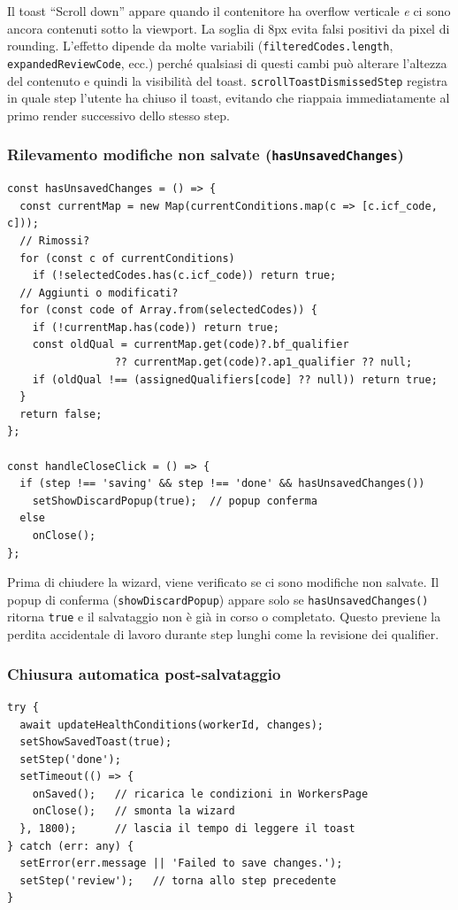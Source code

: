 \documentclass[a4paper,12pt]{article}
\begin{document}
\noindent Il toast ``Scroll down'' appare quando il contenitore ha overflow
verticale \textit{e} ci sono ancora contenuti sotto la viewport.
La soglia di 8px evita falsi positivi da pixel di rounding. L'effetto
dipende da molte variabili (\texttt{filteredCodes.length},
\texttt{expandedReviewCode}, ecc.) perch\'{e} qualsiasi di questi cambi
pu\`{o} alterare l'altezza del contenuto e quindi la visibilit\`{a}
del toast. \texttt{scrollToastDismissedStep} registra in quale step
l'utente ha chiuso il toast, evitando che riappaia immediatamente al
primo render successivo dello stesso step.

\subsubsection{Rilevamento modifiche non salvate (\texttt{hasUnsavedChanges})}

\begin{lstlisting}
const hasUnsavedChanges = () => {
  const currentMap = new Map(currentConditions.map(c => [c.icf_code, c]));
  // Rimossi?
  for (const c of currentConditions)
    if (!selectedCodes.has(c.icf_code)) return true;
  // Aggiunti o modificati?
  for (const code of Array.from(selectedCodes)) {
    if (!currentMap.has(code)) return true;
    const oldQual = currentMap.get(code)?.bf_qualifier
                 ?? currentMap.get(code)?.ap1_qualifier ?? null;
    if (oldQual !== (assignedQualifiers[code] ?? null)) return true;
  }
  return false;
};

const handleCloseClick = () => {
  if (step !== 'saving' && step !== 'done' && hasUnsavedChanges())
    setShowDiscardPopup(true);  // popup conferma
  else
    onClose();
};
\end{lstlisting}

\noindent Prima di chiudere la wizard, viene verificato se ci sono modifiche
non salvate. Il popup di conferma (\texttt{showDiscardPopup}) appare
solo se \texttt{hasUnsavedChanges()} ritorna \texttt{true} e il salvataggio
non \`{e} gi\`{a} in corso o completato. Questo previene la perdita
accidentale di lavoro durante step lunghi come la revisione dei qualifier.

\subsubsection{Chiusura automatica post-salvataggio}
\vspace{2pt}
\begin{lstlisting}
try {
  await updateHealthConditions(workerId, changes);
  setShowSavedToast(true);
  setStep('done');
  setTimeout(() => {
    onSaved();   // ricarica le condizioni in WorkersPage
    onClose();   // smonta la wizard
  }, 1800);      // lascia il tempo di leggere il toast
} catch (err: any) {
  setError(err.message || 'Failed to save changes.');
  setStep('review');   // torna allo step precedente
}
\end{lstlisting}
\end{document}
